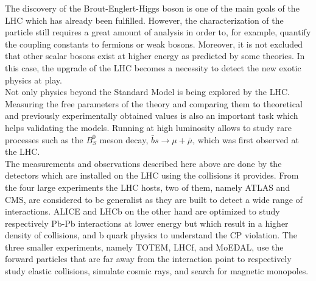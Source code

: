    The discovery of the Brout-Englert-Higgs boson is one of the main goals of the LHC which has already been fulfilled. However, the characterization of the particle still requires a great amount of analysis in order to, for example, quantify the coupling constants to fermions or weak bosons. Moreover, it is not excluded that other scalar bosons exist at higher energy as predicted by some theories. In this case, the upgrade of the LHC becomes a necessity to detect the new exotic physics at play. \\

    Not only physics beyond the Standard Model is being explored by the LHC. Measuring the free parameters of the theory and comparing them to theoretical and previously experimentally obtained values is also an important task which helps validating the models. Running at high luminosity allows to study rare processes such as the $ B^0_S $ meson decay, $ \bar{b}s \rightarrow \mu + \bar{\mu} $, which was first observed at the LHC. \\

    The measurements and observations described here above are done by the detectors which are installed on the LHC using the collisions it provides. From the four large experiments the LHC hosts, two of them, namely ATLAS and CMS, are considered to be generalist as they are built to detect a wide range of interactions. ALICE and LHCb on the other hand are optimized to study respectively Pb-Pb interactions at lower energy but which result in a higher density of collisions, and b quark physics to understand the CP violation. The three smaller experiments, namely TOTEM, LHCf, and MoEDAL, use the forward particles that are far away from the interaction point to respectively study elastic collisions, simulate cosmic rays, and search for magnetic monopoles.
